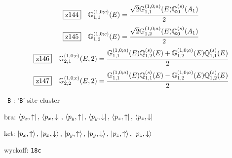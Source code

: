 \documentclass[fleqn,10pt,landscape]{jsarticle}
\begin{document}
\begin{dmath*}
\hspace*{3mm}\fbox{z144}\quad \mathbb{G}_{1,1}^{(1,0;c)}(E)=\frac{\sqrt{2} \mathbb{G}_{1,1}^{(1,0;a)}(E) \mathbb{Q}_{0}^{(s)}(A_{1})}{2}
\end{dmath*}
\begin{dmath*}
\hspace*{3mm}\fbox{z145}\quad \mathbb{G}_{1,2}^{(1,0;c)}(E)=\frac{\sqrt{2} \mathbb{G}_{1,2}^{(1,0;a)}(E) \mathbb{Q}_{0}^{(s)}(A_{1})}{2}
\end{dmath*}
\begin{dmath*}
\hspace*{3mm}\fbox{z146}\quad \mathbb{G}_{2,1}^{(1,0;c)}(E,2)=\frac{\mathbb{G}_{1,1}^{(1,0;a)}(E) \mathbb{Q}_{1,2}^{(s)}(E) + \mathbb{G}_{1,2}^{(1,0;a)}(E) \mathbb{Q}_{1,1}^{(s)}(E)}{2}
\end{dmath*}
\begin{dmath*}
\hspace*{3mm}\fbox{z147}\quad \mathbb{G}_{2,2}^{(1,0;c)}(E,2)=\frac{\mathbb{G}_{1,1}^{(1,0;a)}(E) \mathbb{Q}_{1,1}^{(s)}(E) - \mathbb{G}_{1,2}^{(1,0;a)}(E) \mathbb{Q}_{1,2}^{(s)}(E)}{2}
\end{dmath*}
\vspace{5mm}

\noindent\textbullet\, \texttt{B} : '\texttt{B}' site-cluster

\noindent\quad * bra: $\bra{p_{x},\uparrow},\, \bra{p_{x},\downarrow},\, \bra{p_{y},\uparrow},\, \bra{p_{y},\downarrow},\, \bra{p_{z},\uparrow},\, \bra{p_{z},\downarrow}$

\noindent\quad * ket: $\ket{p_{x},\uparrow},\, \ket{p_{x},\downarrow},\, \ket{p_{y},\uparrow},\, \ket{p_{y},\downarrow},\, \ket{p_{z},\uparrow},\, \ket{p_{z},\downarrow}$

\noindent\quad * wyckoff: \texttt{18c}
\end{document}
